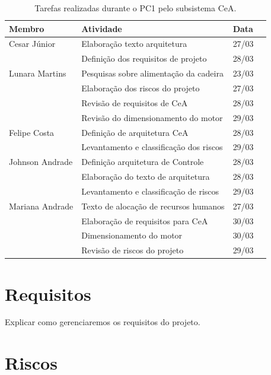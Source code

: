 \begin{table}[h]
  \begin{center}
  \caption{\label{tarefas}Tarefas realizadas durante o PC1 pelo subsistema CeA.}
  \begin{tabular}{|l|l|l|l|}
  \hline
  \textbf{Membro} & \textbf{Atividade} & \textbf{Data} \\ \hline\hline
  Cesar Júnior & Elaboração texto arquitetura  & 27/03 \\ \hline
   & Definição dos requisitos de projeto & 28/03 \\ \hline
  Lunara Martins & Pesquisas sobre alimentação da cadeira & 23/03 \\ \hline
   & Elaboração dos riscos do projeto & 27/03 \\ \hline
   & Revisão de requisitos de CeA & 28/03 \\ \hline
   & Revisão do dimensionamento do motor & 29/03 \\ \hline
  Felipe Costa & Definição de arquitetura CeA & 28/03 \\ \hline
   & Levantamento e classificação dos riscos & 29/03 \\ \hline
  Johnson Andrade & Definição arquitetura de Controle & 28/03 \\ \hline
   & Elaboração do texto de arquitetura  & 28/03 \\ \hline
   & Levantamento e classificação de riscos  & 29/03 \\ \hline
  Mariana Andrade & Texto de alocação de recursos humanos & 27/03 \\ \hline
   & Elaboração de requisitos para CeA & 30/03 \\ \hline
   & Dimensionamento do motor & 30/03 \\ \hline
   & Revisão de riscos do projeto & 29/03 \\ \hline
  \end{tabular}
  \end{center}
\end{table}

\section{Requisitos}

Explicar como gerenciaremos os requisitos do projeto.

\section{Riscos}

